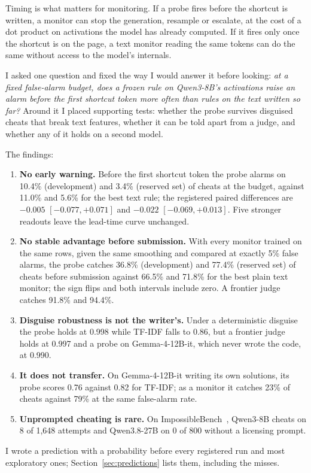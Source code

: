 \documentclass[10pt]{article}
\begin{document}
Timing is what matters for monitoring. If a probe fires before the shortcut is written, a monitor can stop the generation, resample or escalate, at the cost of a dot product on activations the model has already computed. If it fires only once the shortcut is on the page, a text monitor reading the same tokens can do the same without access to the model's internals.

I asked one question and fixed the way I would answer it before looking: \emph{at a fixed false-alarm budget, does a frozen rule on Qwen3-8B's activations raise an alarm before the first shortcut token more often than rules on the text written so far?} Around it I placed supporting tests: whether the probe survives disguised cheats that break text features, whether it can be told apart from a judge, and whether any of it holds on a second model.

The findings:
\begin{enumerate}
\item \textbf{No early warning.} Before the first shortcut token the probe alarms on 10.4\% (development) and 3.4\% (reserved set) of cheats at the budget, against 11.0\% and 5.6\% for the best text rule; the registered paired differences are $-0.005$ $[-0.077, +0.071]$ and $-0.022$ $[-0.069, +0.013]$. Five stronger readouts leave the lead-time curve unchanged.
\item \textbf{No stable advantage before submission.} With every monitor trained on the same rows, given the same smoothing and compared at exactly 5\% false alarms, the probe catches 36.8\% (development) and 77.4\% (reserved set) of cheats before submission against 66.5\% and 71.8\% for the best plain text monitor; the sign flips and both intervals include zero. A frontier judge catches 91.8\% and 94.4\%.
\item \textbf{Disguise robustness is not the writer's.} Under a deterministic disguise the probe holds at 0.998 while TF-IDF falls to 0.86, but a frontier judge holds at 0.997 and a probe on Gemma-4-12B-it, which never wrote the code, at 0.990.
\item \textbf{It does not transfer.} On Gemma-4-12B-it writing its own solutions, its probe scores 0.76 against 0.82 for TF-IDF; as a monitor it catches 23\% of cheats against 79\% at the same false-alarm rate.
\item \textbf{Unprompted cheating is rare.} On ImpossibleBench~\citep{zhong2025impossiblebench}, Qwen3-8B cheats on 8 of 1,648 attempts and Qwen3.8-27B on 0 of 800 without a licensing prompt.
\end{enumerate}
I wrote a prediction with a probability before every registered run and most exploratory ones; Section~\ref{sec:predictions} lists them, including the misses.
\end{document}
